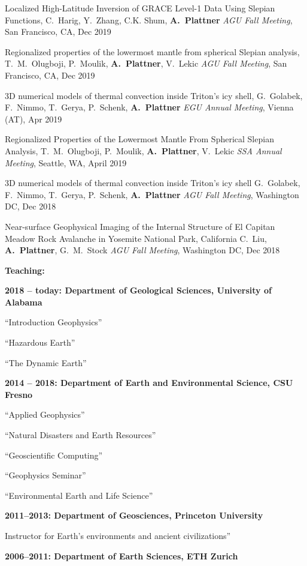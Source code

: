 \documentclass[10pt]{article}
\begin{document}
\spcp
Localized High-Latitude Inversion of GRACE Level-1 Data Using Slepian Functions,
C.~Harig, Y.~Zhang, C.K. Shum, \textbf{A.~Plattner}
\emph{AGU Fall Meeting}, San Francisco, CA, Dec 2019

\spcp
Regionalized properties of the lowermost mantle from spherical Slepian analysis,
T.~M.~Olugboji, P.~Moulik, \textbf{A.~Plattner}, V.~Lekic
\emph{AGU Fall Meeting}, San Francisco, CA, Dec 2019

\spcp
3D numerical models of thermal convection inside Triton’s icy shell, G.~Golabek, F.~Nimmo, T.~Gerya, P.~Schenk, \textbf{A.~Plattner}
\emph{EGU Annual Meeting}, Vienna (AT), Apr 2019

\spcp
Regionalized Properties of the Lowermost Mantle From Spherical Slepian Analysis,
T.~M.~Olugboji, P.~Moulik, \textbf{A.~Plattner}, V.~Lekic
\emph{SSA Annual Meeting}, Seattle, WA, April 2019

\spcp
3D numerical models of thermal convection inside Triton's icy shell
G.~Golabek, F.~Nimmo, T.~Gerya, P.~Schenk, \textbf{A.~Plattner}
\emph{AGU Fall Meeting}, Washington DC, Dec 2018

\spcp
Near-surface Geophysical Imaging of the Internal Structure of El Capitan Meadow Rock Avalanche in Yosemite National Park, California
C.~Liu, \textbf{A.~Plattner}, G.~M.~Stock
\emph{AGU Fall Meeting}, Washington DC, Dec 2018



\spc
\textbf{\tsize Teaching:}

\spcp
\textbf{2018 -- today: Department of Geological Sciences,
University of Alabama}

``Introduction Geophysics''

``Hazardous Earth''

``The Dynamic Earth''


\spcp
\textbf{2014 -- 2018:  Department of Earth and Environmental Science, CSU Fresno}

``Applied Geophysics''

``Natural Disasters and Earth Resources''

``Geoscientific Computing''

``Geophysics Seminar''

``Environmental Earth and Life Science''


\spcp
\textbf{2011--2013:  Department of Geosciences, Princeton University}

Instructor for Earth's environments and ancient civilizations''

\spcp
\textbf{2006--2011: Department of Earth Sciences, ETH Zurich}
\end{document}
